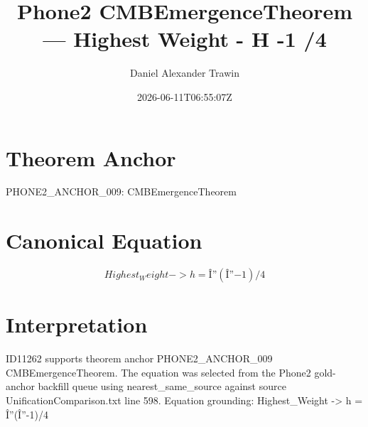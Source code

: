 \documentclass[11pt]{article}
\title{Phone2 CMBEmergenceTheorem — Highest Weight - H -1 /4}
\author{Daniel Alexander Trawin}
\date{2026-06-11T06:55:07Z}
\begin{document}
\maketitle
\section*{Theorem Anchor}
PHONE2_ANCHOR_009: CMBEmergenceTheorem
\section*{Canonical Equation}
\[
Highest_Weight -> h = Î”(Î”-1)/4
\]
\section*{Interpretation}
ID11262 supports theorem anchor PHONE2_ANCHOR_009 CMBEmergenceTheorem. The equation was selected from the Phone2 gold-anchor backfill queue using nearest_same_source against source UnificationComparison.txt line 598. Equation grounding: Highest_Weight -> h = Î”(Î”-1)/4
\end{document}

